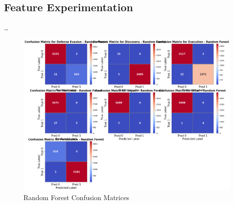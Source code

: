         
    \subsection{Feature Experimentation}
        
        \ldots
        
        
        
        
        \clearpage

        
        \begin{figure}[H]
        
            \centering
            
            \begin{minipage}{\textwidth}
                \centering
                \begin{minipage}[c]{0.8\textwidth}
                    \centering
                    \includegraphics[width=\textwidth]{../figures/plots/section2/Random_Forest_base_evaluation.png}
                    \caption{Random Forest Confusion Matrices}
                    \label{fig:}
                \end{minipage}%
            \end{minipage}

            \vspace{0.5cm}  %
            

\end{figure}
